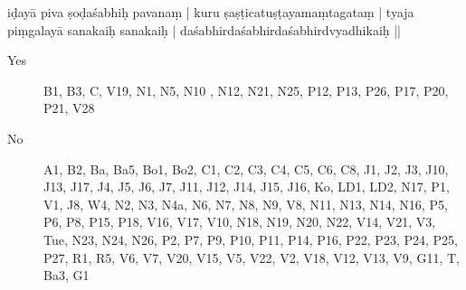 \begin{ekdosis}
\begin{marma}[hp01_055]
\begin{marma}[hp02_009]
\begin{marma}[hp02_011]
iḍayā piva ṣoḍaśabhiḥ pavanaṃ |
kuru ṣaṣṭicatuṣṭayamaṃtagataṃ |
tyaja piṃgalayā sanakaiḥ sanakaiḥ |
daśabhirdaśabhirdaśabhirdvyadhikaiḥ ||
\begin{description}
\item[Yes] B1, B3, C, V19, N1, N5, N10 , N12, N21, N25, P12, P13, P26, P17, P20, P21, V28
\item[No] A1, B2, Ba, Ba5, Bo1, Bo2, C1, C2, C3, C4, C5, C6, C8, J1, J2, J3, J10, J13, J17, J4, J5, J6, J7, J11, J12, J14, J15, J16, Ko, LD1, LD2, N17, P1, V1, J8, W4, N2, N3, N4a, N6, N7, N8, N9, V8, N11, N13, N14, N16, P5, P6, P8, P15, P18, V16, V17, V10, N18, N19, N20, N22, V14, V21, V3, Tue, N23, N24, N26, P2, P7, P9, P10, P11, P14, P16, P22, P23, P24, P25, P27, R1, R5, V6, V7, V20, V15, V5, V22, V2, V18, V12, V13, V9, G11, T, Ba3, G1
    \end{description}



\end{marma}
\end{marma}
\end{marma}
\end{ekdosis}
